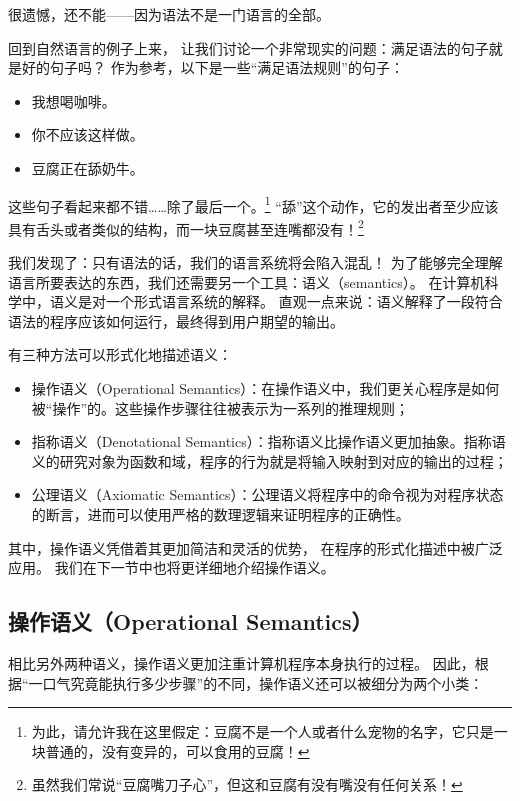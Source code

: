 \documentclass[../main.tex]{subfiles}
\begin{document}
  \indent 很遗憾，还不能——因为语法不是一门语言的全部。

  \indent 回到自然语言的例子上来，
  让我们讨论一个非常现实的问题：满足语法的句子就是好的句子吗？
  作为参考，以下是一些“满足语法规则”的句子：

  \begin{itemize}
    \item 我想喝咖啡。
    \item 你不应该这样做。
    \item 豆腐正在舔奶牛。
  \end{itemize}

  \indent 这些句子看起来都不错……除了最后一个。\footnote[1]{为此，请允许我在这里假定：豆腐不是一个人或者什么宠物的名字，它只是一块普通的，没有变异的，可以食用的豆腐！}
  “舔”这个动作，它的发出者至少应该具有舌头或者类似的结构，而一块豆腐甚至连嘴都没有！\footnote[2]{虽然我们常说“豆腐嘴刀子心”，但这和豆腐有没有嘴没有任何关系！}

  \indent 我们发现了：只有语法的话，我们的语言系统将会陷入混乱！
  为了能够完全理解语言所要表达的东西，我们还需要另一个工具：语义（semantics）。
  在计算机科学中，语义是对一个形式语言系统的解释。\cite{semwiki}
  直观一点来说：语义解释了一段符合语法的程序应该如何运行，最终得到用户期望的输出。

  \indent 有三种方法可以形式化地描述语义：\cite{tapl}\cite{opwiki}

  \begin{itemize}
    \item 操作语义（Operational Semantics）：在操作语义中，我们更关心程序是如何被“操作”的。这些操作步骤往往被表示为一系列的推理规则；
    \item 指称语义（Denotational Semantics）：指称语义比操作语义更加抽象。指称语义的研究对象为函数和域，程序的行为就是将输入映射到对应的输出的过程；
    \item 公理语义（Axiomatic Semantics）：公理语义将程序中的命令视为对程序状态的断言，进而可以使用严格的数理逻辑来证明程序的正确性。
  \end{itemize}

  \indent 其中，操作语义凭借着其更加简洁和灵活的优势，
  在程序的形式化描述中被广泛应用。\cite{tapl}
  我们在下一节中也将更详细地介绍操作语义。

  \subsection{操作语义（Operational Semantics）}
  \indent 相比另外两种语义，操作语义更加注重计算机程序本身执行的过程。
  因此，根据“一口气究竟能执行多少步骤”的不同，操作语义还可以被细分为两个小类：\cite{opwiki}
\end{document}
